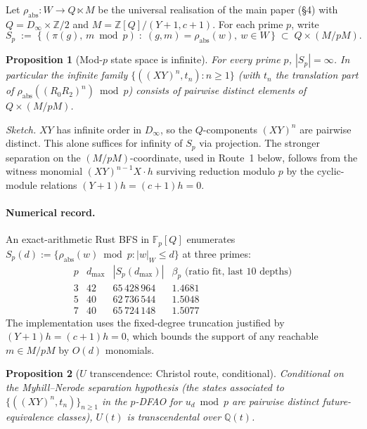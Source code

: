 \documentclass[11pt,a4paper]{article}
\newtheorem{proposition}{Proposition}
\theoremstyle{remark}
\theoremstyle{plain}
\begin{document}
Let $\rho_{\mathrm{abs}}: W \to Q \ltimes M$ be the universal
realisation of the main paper (\S4) with $Q = D_\infty \times \mathbb{Z}/2$
and $M = \mathbb{Z}[Q]/(Y+1, c+1)$.  For each prime $p$, write
\[
S_p \;:=\; \bigl\{\,(\pi(g),\, m \bmod p) \;:\; (g,m) = \rho_{\mathrm{abs}}(w),\ w \in W \,\bigr\}
\;\subset\; Q \times (M/pM).
\]

\begin{proposition}[Mod-$p$ state space is infinite]
\label{prop:modp-state-infinite}
For every prime $p$, $|S_p| = \infty$.  In particular the infinite
family $\{((XY)^n, t_n) : n \ge 1\}$ (with $t_n$ the translation part
of $\rho_{\mathrm{abs}}((R_0 R_2)^n) \bmod p$) consists of pairwise
distinct elements of $Q \times (M/pM)$.
\end{proposition}

\emph{Sketch.}  $XY$ has infinite order in $D_\infty$, so the
$Q$-components $(XY)^n$ are pairwise distinct.  This alone suffices for
infinity of $S_p$ via projection.  The stronger separation on the
$(M/pM)$-coordinate, used in Route~1 below, follows from the witness
monomial $(XY)^{n-1} X \cdot h$ surviving reduction modulo $p$ by the
cyclic-module relations $(Y+1)h = (c+1)h = 0$.

\paragraph{Numerical record.}
An exact-arithmetic Rust BFS in $\mathbb{F}_p[Q]$ enumerates $S_p(d) :=
\{\rho_{\mathrm{abs}}(w) \bmod p : |w|_W \le d\}$ at three primes:
\[
\begin{array}{c|c|c|c}
p & d_{\max} & |S_p(d_{\max})| & \beta_p \text{ (ratio fit, last 10 depths)} \\ \hline
3 & 42 & 65\,428\,964 & 1.4681 \\
5 & 40 & 62\,736\,544 & 1.5048 \\
7 & 40 & 65\,724\,148 & 1.5077
\end{array}
\]
The implementation uses the fixed-degree truncation justified by
$(Y+1)h = (c+1)h = 0$, which bounds the support of any reachable
$m \in M/pM$ by $O(d)$ monomials.

\begin{proposition}[$U$ transcendence: Christol route, conditional]
\label{prop:beta2-christol}
Conditional on the Myhill--Nerode separation hypothesis (the states
associated to $\{((XY)^n, t_n)\}_{n \ge 1}$ in the $p$-DFAO for
$u_d \bmod p$ are pairwise distinct future-equivalence classes), $U(t)$
is transcendental over $\mathbb{Q}(t)$.
\end{proposition}
\end{document}
